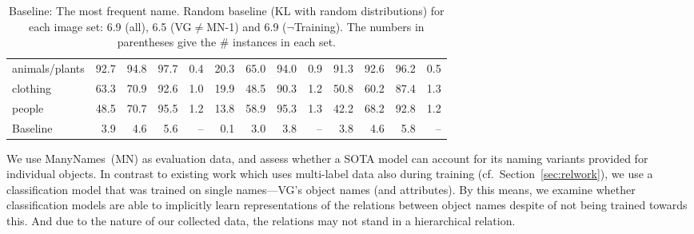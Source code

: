 \begin{table*}
\begin{tabular}{l@{~}|@{~}r@{~}r@{~}rr@{~}|@{~}r@{~}r@{~}rr@{~}|@{~}r@{~}r@{~}rr}
		animals/plants &               92.7 &                 94.8 &                   97.7 &            0.4 &            20.3 &              65.0 &                94.0 &         0.9 &             91.3 &               92.6 &                 96.2 &          0.5 \\
		clothing       &               63.3 &                 70.9 &                   92.6 &            1.0 &            19.9 &              48.5 &                90.3 &         1.2 &             50.8 &               60.2 &                 87.4 &          1.3 \\
		people         &               48.5 &                 70.7 &                   95.5 &            1.2 &            13.8 &              58.9 &                95.3 &         1.3 &             42.2 &               68.2 &                 92.8 &          1.2 \\
		\bottomrule
		Baseline       &                3.9 &                  4.6 &                    5.6 &            -- &             0.1 &               3.0 &                 3.8 &         -- &              3.8 &                4.6 &                  5.8 &          -- \\
	\end{tabular}
	\caption{Baseline: The most frequent name. Random baseline (KL with random distributions) for each image set: 6.9 (all), 6.5 (VG$\neq$MN-1) and 6.9 ($\neg$Training). The numbers in parentheses give the \# instances in each set.	\label{tab:model}}
\end{table*}
%
%
We use ManyNames\ (MN) as evaluation data, and assess whether a SOTA model can account for its naming variants provided for individual objects. 
In contrast to existing work which uses multi-label data also during training (cf.\ Section\ \ref{sec:relwork}), we use a classification model that was trained on single names---VG's object names (and attributes). %
By this means, we examine whether classification models are able to implicitly learn representations of the relations between object names despite of not being trained towards this. 
And due to the nature of our collected data, the relations may not stand in a hierarchical relation. 

